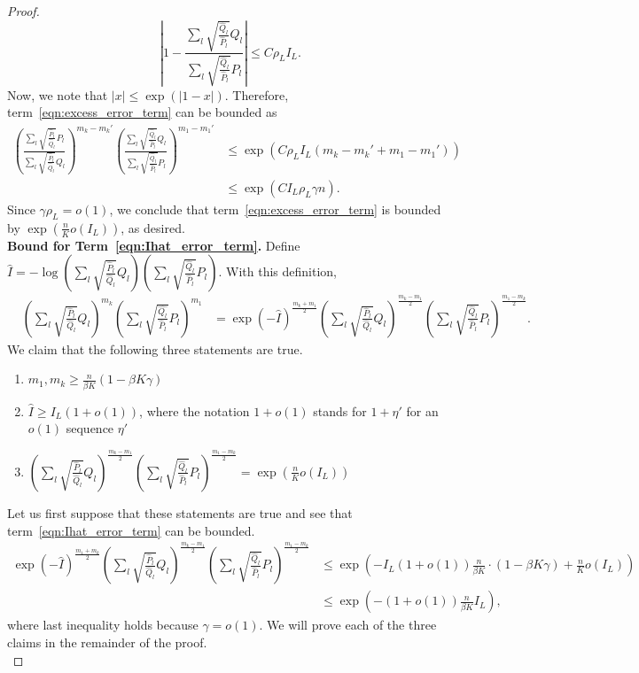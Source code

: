 \documentclass{article}
\begin{document}
\begin{proof}
\[
\left| 1 - \frac{ \sum_l \sqrt{\frac{\hat{Q}_l}{\hat{P}_l} } Q_l}
             { \sum_l \sqrt{\frac{\hat{Q}_l}{\hat{P}_l} } P_l} \right| 
\leq C\rho_LI_L. 
\]
Now, we note that $ |x| \leq \exp( | 1 - x | )$. Therefore, term~\ref{eqn:excess_error_term} can be bounded as
\begin{align*}
  \left( \frac{\sum_l \sqrt{\frac{\hat{P}_l}{\hat{Q}_l} } P_l}
                {\sum_l \sqrt{\frac{\hat{P}_l}{\hat{Q}_l} } Q_l}  \right)^{m_k - m_k'}
 \left( \frac{ \sum_l \sqrt{\frac{\hat{Q}_l}{\hat{P}_l} } Q_l}
             { \sum_l \sqrt{\frac{\hat{Q}_l}{\hat{P}_l} } P_l} \right)^{m_1 - m_1'}  &\leq \exp( C \rho_L I_L (m_k - m_k' + m_1 - m_1') ) \\
&\leq \exp( C I_L \rho_L \gamma n).
\end{align*}
Since $\gamma \rho_L = o(1)$,  we conclude that term~\ref{eqn:excess_error_term} is bounded by $\exp \left( \frac{n}{K}o(I_L)\right)$, as desired.\\
 
\noindent \textbf{Bound for Term~\ref{eqn:Ihat_error_term}.} Define 
$\hat{I} = - \log \left( \sum_l \sqrt{\frac{\hat{P}_l}{\hat{Q}_l}} Q_l \right) \left( \sum_l \sqrt{\frac{\hat{Q}_l}{\hat{P}_l}} P_l \right) $. 
With this definition, 
\begin{align*}
& \left( \sum_l \sqrt{\frac{\hat{P}_l}{\hat{Q}_l} } Q_l \right)^{m_k} 
       \left( \sum_l \sqrt{\frac{\hat{Q_l}}{\hat{P}_l} } P_l \right)^{m_1} 
&= \exp( - \hat{I} )^{\frac{m_k + m_1}{2}}  \left( \sum_l \sqrt{\frac{\hat{P}_l}{\hat{Q}_l}} Q_l \right)^{\frac{m_k - m_1}{2}} 
 \left( \sum_l \sqrt{\frac{\hat{Q}_l}{\hat{P}_l}} P_l \right)^{\frac{m_1 - m_k}{2}}.
\end{align*}
We claim that the following three statements are true. 
\begin{enumerate}
\item $ m_1, m_k \geq \frac{n}{\beta K} (1 -\beta K \gamma)$
\item $\hat{I} \geq I_L(1 + o(1))$, where the notation $1+o(1)$ stands for $1+\eta'$ for an $o(1)$ sequence $\eta'$ 
\item $\left( \sum_l \sqrt{\frac{\hat{P}_l}{\hat{Q}_l}} Q_l \right)^{\frac{m_k - m_1}{2}} 
 \left( \sum_l \sqrt{\frac{\hat{Q}_l}{\hat{P}_l}} P_l \right)^{\frac{m_1 - m_k}{2}} = \exp\left(\frac{n}{K}  o(I_L)\right) $
\end{enumerate}
Let us first suppose that these statements are true and see that term~\ref{eqn:Ihat_error_term} can be bounded. 
\begin{align*}
\exp( - \hat{I} )^{\frac{m_1 + m_k}{2}}  \left( \sum_l \sqrt{\frac{\hat{P}_l}{\hat{Q}_l}} Q_l \right)^{\frac{m_k - m_1}{2}} 
 \left( \sum_l \sqrt{\frac{\hat{Q}_l}{\hat{P}_l}} P_l \right)^{\frac{m_1 - m_k}{2}}  &\leq  \exp \left( - I_L(1+o(1)) \frac{n}{\beta K} \cdot (1 -\beta K \gamma) + \frac{n}{K} o(I_L)\right)  \\
&\leq \exp \left( - (1+o(1)) \frac{n}{\beta K} I_L  \right), 
\end{align*}
where last inequality holds because $\gamma = o(1)$. We will prove each of the three claims in the remainder of the proof.\\


\end{proof}
\end{document}
